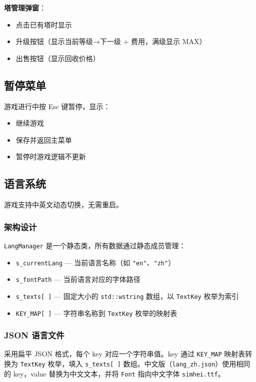 \documentclass[12pt,a4paper]{ctexart}
\begin{document}
\textbf{塔管理弹窗}：
\begin{itemize}
    \item 点击已有塔时显示
    \item 升级按钮（显示当前等级→下一级 + 费用，满级显示 MAX）
    \item 出售按钮（显示回收价格）
\end{itemize}

\subsection{暂停菜单}

游戏进行中按 Esc 键暂停，显示：
\begin{itemize}
    \item 继续游戏
    \item 保存并返回主菜单
    \item 暂停时游戏逻辑不更新
\end{itemize}

\subsection{语言系统}

游戏支持中英文动态切换，无需重启。

\subsubsection{架构设计}

\texttt{LangManager} 是一个静态类，所有数据通过静态成员管理：

\begin{itemize}
    \item \texttt{s\_currentLang} — 当前语言名称（如 \texttt{"en"}、\texttt{"zh"}）
    \item \texttt{s\_fontPath} — 当前语言对应的字体路径
    \item \texttt{s\_texts[\,]} — 固定大小的 \texttt{std::wstring} 数组，以 \texttt{TextKey} 枚举为索引
    \item \texttt{KEY\_MAP[\,]} — 字符串名称到 \texttt{TextKey} 枚举的映射表
\end{itemize}

\subsubsection{JSON 语言文件}

采用扁平 JSON 格式，每个 key 对应一个字符串值。key 通过 \texttt{KEY\_MAP} 映射表转换为 \texttt{TextKey} 枚举，填入 \texttt{s\_texts[\,]} 数组。中文版（\texttt{lang\_zh.json}）使用相同的 key，value 替换为中文文本，并将 \texttt{Font} 指向中文字体 \texttt{simhei.ttf}。
\end{document}
